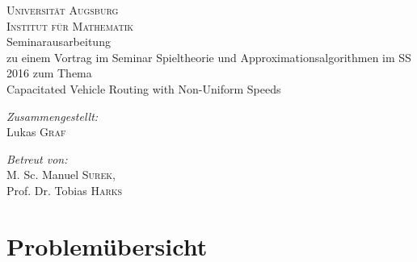 \documentclass[a4paper,ngerman,12pt,bibtotoc]{scrartcl}
\theoremstyle{definition}
\theoremstyle{plain}
\theoremstyle{remark}
\begin{document}
	\author{Lukas Graf}
	\date{Letzte Aktualisierung: \today}
	
	\thispagestyle{empty}
	
	
	\begin{titlepage}\center
	\textsc{\LARGE Universität Augsburg}\\[1.5cm]
	
	\textsc{\Large Institut für Mathematik}\\[2.5cm]
	
	{\Large Seminar\glqq ausarbeitung\grqq \\[1cm]}
	zu einem Vortrag im Seminar Spieltheorie und Approximationsalgorithmen im SS 2016 zum Thema\\[1.5cm]
	{\huge Capacitated Vehicle Routing with Non-Uniform Speeds}
		
	
	\vfill
	
	\begin{minipage}{0.4\textwidth}
		\begin{flushleft} \large
			\emph{Zusammengestellt:}\\
			Lukas \textsc{Graf}
		\end{flushleft}
	\end{minipage}
	\begin{minipage}{0.4\textwidth}
		\begin{flushright} \large
			\emph{Betreut von:} \\
			M. Sc. Manuel \textsc{Surek},\\Prof. Dr. Tobias \textsc{Harks}
		\end{flushright}
	\end{minipage}
	
	\end{titlepage}
	
	\section{Problemübersicht}
	
\end{document}
